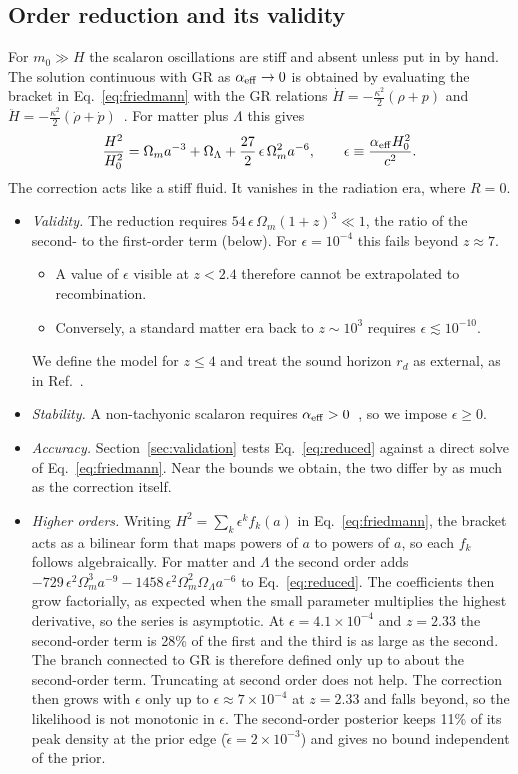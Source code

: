 \documentclass[11pt,a4paper]{article}
\newcommand{\aeff}{\alpha_{\rm eff}}
\newcommand{\et}{\tilde\epsilon}
\begin{document}
\subsection{Order reduction and its validity}\label{sec:reduction}
For $m_0\gg H$ the scalaron oscillations are stiff and absent unless put in by hand. The solution continuous with GR as $\aeff\to0$ is obtained by evaluating the bracket in Eq.~\eqref{eq:friedmann} with the GR relations $\dot H=-\tfrac{\kappa^2}{2}(\rho+p)$ and $\ddot H=-\tfrac{\kappa^2}{2}(\dot\rho+\dot p)$~\cite{Simon1990,gr-qc_9211002}. For matter plus $\Lambda$ this gives
\begin{equation}
\frac{H^2}{H_0^2}=\Omega_ma^{-3}+\Omega_\Lambda+\frac{27}{2}\,\epsilon\,\Omega_m^2a^{-6},\qquad \epsilon\equiv\frac{\aeff H_0^2}{c^2}.
\label{eq:reduced}
\end{equation}
The correction acts like a stiff fluid. It vanishes in the radiation era, where $R=0$.
\begin{itemize}
\item \emph{Validity.} The reduction requires $54\,\epsilon\,\Omega_m(1+z)^3\ll1$, the ratio of the second- to the first-order term (below). For $\epsilon=10^{-4}$ this fails beyond $z\approx7$.
  \begin{itemize}
  \item A value of $\epsilon$ visible at $z<2.4$ therefore cannot be extrapolated to recombination.
  \item Conversely, a standard matter era back to $z\sim10^3$ requires $\epsilon\lesssim10^{-10}$.
  \end{itemize}
  We define the model for $z\le4$ and treat the sound horizon $r_d$ as external, as in Ref.~\cite{2607.22126}.
\item \emph{Stability.} A non-tachyonic scalaron requires $\aeff>0$~\cite{astro-ph_0307285}, so we impose $\epsilon\ge0$.
\item \emph{Accuracy.} Section~\ref{sec:validation} tests Eq.~\eqref{eq:reduced} against a direct solve of Eq.~\eqref{eq:friedmann}. Near the bounds we obtain, the two differ by as much as the correction itself.
\item \emph{Higher orders.} Writing $H^2=\sum_k\epsilon^kf_k(a)$ in Eq.~\eqref{eq:friedmann}, the bracket acts as a bilinear form that maps powers of $a$ to powers of $a$, so each $f_k$ follows algebraically. For matter and $\Lambda$ the second order adds $-729\,\epsilon^2\Omega_m^3a^{-9}-1458\,\epsilon^2\Omega_m^2\Omega_\Lambda a^{-6}$ to Eq.~\eqref{eq:reduced}. The coefficients then grow factorially, as expected when the small parameter multiplies the highest derivative, so the series is asymptotic. At $\epsilon=4.1\times10^{-4}$ and $z=2.33$ the second-order term is 28\% of the first and the third is as large as the second. The branch connected to GR is therefore defined only up to about the second-order term. Truncating at second order does not help. The correction then grows with $\epsilon$ only up to $\epsilon\approx7\times10^{-4}$ at $z=2.33$ and falls beyond, so the likelihood is not monotonic in $\epsilon$. The second-order posterior keeps 11\% of its peak density at the prior edge ($\et=2\times10^{-3}$) and gives no bound independent of the prior.
\end{itemize}
\end{document}
